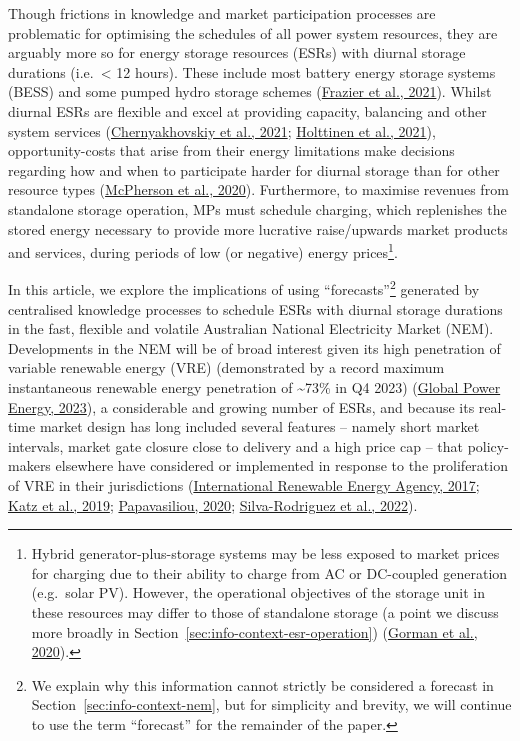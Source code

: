 \documentclass[12pt,a4paper,]{report}
\begin{document}
Though frictions in knowledge and market participation processes are
problematic for optimising the schedules of all power system resources,
they are arguably more so for energy storage resources (ESRs) with
diurnal storage durations (i.e.~\textless{} 12 hours). These include
most battery energy storage systems (BESS) and some pumped hydro storage
schemes (\protect\hyperlink{ref-frazierStorageFuturesStudy2021}{Frazier
et al., 2021}). Whilst diurnal ESRs are flexible and excel at providing
capacity, balancing and other system services
(\protect\hyperlink{ref-chernyakhovskiyUSAIDEnergyStorage2021}{Chernyakhovskiy
et al., 2021};
\protect\hyperlink{ref-holttinenDesignOperationEnergy2021}{Holttinen et
al., 2021}), opportunity-costs that arise from their energy limitations
make decisions regarding how and when to participate harder for diurnal
storage than for other resource types
(\protect\hyperlink{ref-mcphersonImpactsStorageDispatch2020}{McPherson
et al., 2020}). Furthermore, to maximise revenues from standalone
storage operation, MPs must schedule charging, which replenishes the
stored energy necessary to provide more lucrative raise/upwards market
products and services, during periods of low (or negative) energy
prices\footnote{Hybrid generator-plus-storage systems may be less
  exposed to market prices for charging due to their ability to charge
  from AC or DC-coupled generation (e.g.~solar PV). However, the
  operational objectives of the storage unit in these resources may
  differ to those of standalone storage (a point we discuss more broadly
  in Section~\ref{sec:info-context-esr-operation})
  (\protect\hyperlink{ref-gormanMotivationsOptionsDeploying2020}{Gorman
  et al., 2020}).}.

In this article, we explore the implications of using
``forecasts''\footnote{We explain why this information cannot strictly
  be considered a forecast in Section~\ref{sec:info-context-nem}, but
  for simplicity and brevity, we will continue to use the term
  ``forecast'' for the remainder of the paper.} generated by centralised
knowledge processes to schedule ESRs with diurnal storage durations in
the fast, flexible and volatile Australian National Electricity Market
(NEM). Developments in the NEM will be of broad interest given its high
penetration of variable renewable energy (VRE) (demonstrated by a record
maximum instantaneous renewable energy penetration of
\textasciitilde73\% in Q4 2023)
(\protect\hyperlink{ref-globalpowerenergyWelcomeGPENEMLog22023}{Global
Power Energy, 2023}), a considerable and growing number of ESRs, and
because its real-time market design has long included several features
-- namely short market intervals, market gate closure close to delivery
and a high price cap -- that policy-makers elsewhere have considered or
implemented in response to the proliferation of VRE in their
jurisdictions
(\protect\hyperlink{ref-internationalrenewableenergyagencyAdaptingMarketDesign2017}{International
Renewable Energy Agency, 2017};
\protect\hyperlink{ref-katzOpeningMarketsDesigning2019}{Katz et al.,
2019};
\protect\hyperlink{ref-papavasiliouScarcityPricingMissing2020}{Papavasiliou,
2020};
\protect\hyperlink{ref-silva-rodriguezShortTermWholesale2022}{Silva-Rodriguez
et al., 2022}).
\end{document}
